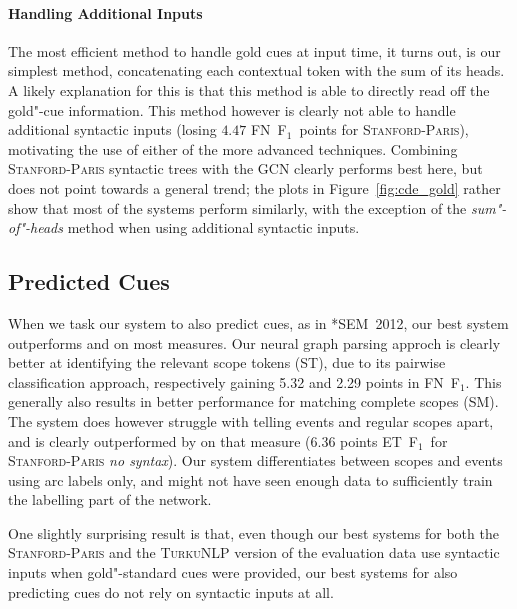 \documentclass[11pt,a4paper]{article}
\theoremstyle{plain}
\def\fscore{F$_1$}
\begin{document}
\paragraph{Handling Additional Inputs}

The most efficient method to handle gold cues at input time, it turns out, is
our simplest method, concatenating each contextual token with the sum of its
heads.
A likely explanation for this is that this method is able to directly
read off the gold"-cue information.
This method however is clearly not able to handle additional syntactic inputs
(losing $4.47$ FN~\fscore\ points for \textsc{Stanford-Paris}), motivating the use
of either of the more advanced techniques.
Combining \textsc{Stanford-Paris} syntactic trees with the GCN clearly
performs best here, but does not point towards a general trend;
the plots in Figure~\ref{fig:cde_gold} rather show that most of the systems
perform similarly, with the exception of the \emph{sum"-of"-heads} method when
using additional syntactic inputs.

\subsection{Predicted Cues}

When we task our system to also predict cues, as in *SEM~2012, our best
system outperforms \citet{Rea:Vel:Ovr:12} and \citet{Pac:Ben:Rea:14} on most
measures.
Our neural graph parsing approch is clearly better at identifying the relevant
scope tokens (ST), due to its pairwise classification approach, respectively gaining 5.32
and 2.29 points in FN~\fscore.
This generally also results in better performance for matching complete scopes
(SM).
The system does however struggle with telling events and regular scopes apart,
and is clearly outperformed by \citet{Rea:Vel:Ovr:12} on that measure (6.36 points ET~\fscore\ for \textsc{Stanford-Paris}
\emph{no syntax}).
Our system differentiates between scopes and events using arc labels only, and
might not have seen enough data to sufficiently train the labelling
part of the network.

One slightly surprising result is that, even though our best systems for both
the \textsc{Stanford-Paris} and the \textsc{TurkuNLP} version of the evaluation
data use syntactic inputs when gold"-standard cues were provided,
our best systems for also predicting cues do not rely on syntactic
inputs at all.
\end{document}
